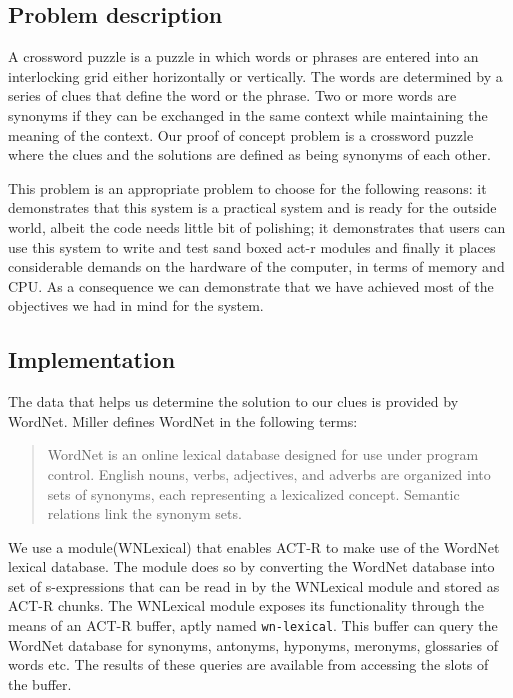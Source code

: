 \subsection{Problem description}

A crossword puzzle is a puzzle in which words or phrases are entered
into an interlocking grid either horizontally or vertically. The words
are determined by a series of clues that define the word or the
phrase. Two or more words are synonyms if they can be exchanged in the
same context while maintaining the meaning of the context. Our proof
of concept problem is a crossword puzzle where the clues and the
solutions are defined as being synonyms of each other.


This problem is an appropriate problem to choose for the following
reasons: it demonstrates that this system is a practical system and is
ready for the outside world, albeit the code needs little bit of
polishing; it demonstrates that users can use this system to write and
test sand boxed act-r modules and finally it places considerable
demands on the hardware of the computer, in terms of memory and
CPU. As a consequence we can demonstrate that we have achieved most of
the objectives we had in mind for the system.

\subsection{Implementation}

The data that helps us determine the solution to our clues is provided
by WordNet\cite{journals/cacm/Miller95}. Miller defines WordNet in the
following terms:

\begin{quote}
  WordNet is an online lexical database designed for use under
  program control. English nouns, verbs, adjectives, and adverbs are
  organized into sets of synonyms, each representing a lexicalized
  concept. Semantic relations link the synonym sets. 
\end{quote}

We use a module(WNLexical) that enables ACT-R to make use of the
WordNet lexical database. The module does so by converting the WordNet
database into set of s-expressions that can be read in by the
WNLexical module and stored as ACT-R chunks. The WNLexical module
exposes its functionality through the means of an ACT-R buffer, aptly
named \texttt{wn-lexical}. This buffer can query the WordNet database
for synonyms, antonyms, hyponyms, meronyms, glossaries of words
etc. The results of these queries are available from accessing the
slots of the buffer.


